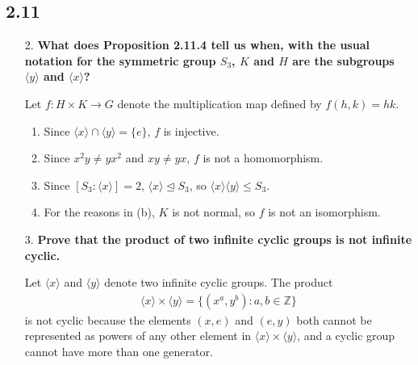 \documentclass[a4paper,12pt]{article}
\begin{document}
\subsection*{2.11}
\begin{enumerate}
    \item[2.]
        \boldmath
        \textbf{What does Proposition 2.11.4 tell us when, with the usual notation for the symmetric group $S_3$, $K$ and $H$ are the subgroups $\langle y \rangle$ and $\langle x \rangle$?} \par
        \unboldmath
        Let $f : H \times K \to G$ denote the multiplication map defined by $f(h, k) = hk$.
        \begin{enumerate}
            \item
                Since $\langle x \rangle \cap \langle y \rangle = \{ e \}$, $f$ is injective.

            \item
                Since $x^2y \neq yx^2$ and $xy \neq yx$, $f$ is not a homomorphism.

            \item
                \iffalse
                For the reasons in (b), $\langle x \rangle$ and $\langle y \rangle$ do not commute with elements of and are hence not normal subgroups of $S_3$, so $\langle x \rangle \langle y \rangle$ is not a subgroup of $S_3$.
                \fi
                Since $[ S_3 : \langle x \rangle ] = 2$, $\langle x \rangle \trianglelefteq S_3$, so $\langle x \rangle \langle y \rangle \leq S_3$. 

            \item
                \iffalse
                Since $\langle x \rangle$ and $\langle y \rangle$ are not normal subgroups of $S_3$, $f$ is not an isomorphism.
                \fi
                For the reasons in (b), $K$ is not normal, so $f$ is not an isomorphism.
        \end{enumerate}

    \item[3.]
        \boldmath
        \textbf{Prove that the product of two infinite cyclic groups is not infinite cyclic.} \par
        \unboldmath
        Let $\langle x \rangle$ and $\langle y \rangle$ denote two infinite cyclic groups. The product
        \begin{align*}
            \langle x \rangle \times \langle y \rangle = \{ (x^a, y^b) : a, b \in \mathbb{Z} \}
        \end{align*}
        is not cyclic because the elements $(x, e)$ and $(e, y)$ both cannot be represented as powers of any other element in $\langle x \rangle \times \langle y \rangle$, and a cyclic group cannot have more than one generator.


\end{enumerate}
\end{document}
